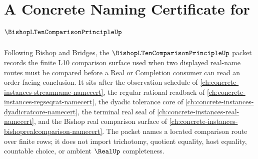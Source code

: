 \chapter{A Concrete Naming Certificate for $\BishopLTenComparisonPrincipleUp$}
\label{ch:concrete-instances-bishop-l10-comparison-principle-namecert}

Following Bishop and Bridges, the $\BishopLTenComparisonPrincipleUp$ packet records the finite L10 comparison surface used when two displayed real-name routes must be compared before a Real or Completion consumer can read an order-facing conclusion. It sits after the observation schedule of \autoref{ch:concrete-instances-streamname-namecert}, the regular rational readback of \autoref{ch:concrete-instances-regseqrat-namecert}, the dyadic tolerance core of \autoref{ch:concrete-instances-dyadicratcore-namecert}, the terminal real seal of \autoref{ch:concrete-instances-real-namecert}, and the Bishop real comparison surface of \autoref{ch:concrete-instances-bishoprealcomparison-namecert}. The packet names a located comparison route over finite rows; it does not import trichotomy, quotient equality, host equality, countable choice, or ambient $\RealUp$ completeness.

